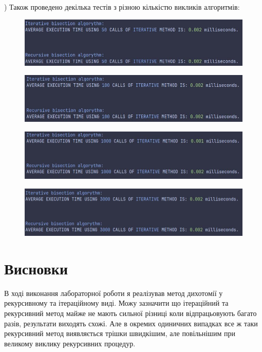 \clearpage
{}) Також проведено декілька тестів з різною кількістю викликів алгоритмів:

\begin{figure}[h!]
    \centering
    \includegraphics[width=13cm]{reports/algos/lab2/assets/8.png}
\end{figure}

\begin{figure}[h!]
    \centering
    \includegraphics[width=13cm]{reports/algos/lab2/assets/9.png}
\end{figure}

\begin{figure}[h!]
    \centering
    \includegraphics[width=13cm]{reports/algos/lab2/assets/10.png}
\end{figure}

\begin{figure}[h!]
    \centering
    \includegraphics[width=13cm]{reports/algos/lab2/assets/11.png}
\end{figure}

\clearpage
\section{Висновки}
В ході виконання лабораторної роботи я реалізував метод дихотомії у рекурсивному та ітераційному виді. Можу зазначити що ітераційний та рекурсивний метод майже не мають сильної різниці коли відпрацьовують багато разів, результати виходять схожі. Але в окремих одиничних випадках все ж таки рекурсивний метод виявляється трішки швидкішим, але повільнішим при великому виклику рекурсивних процедур.